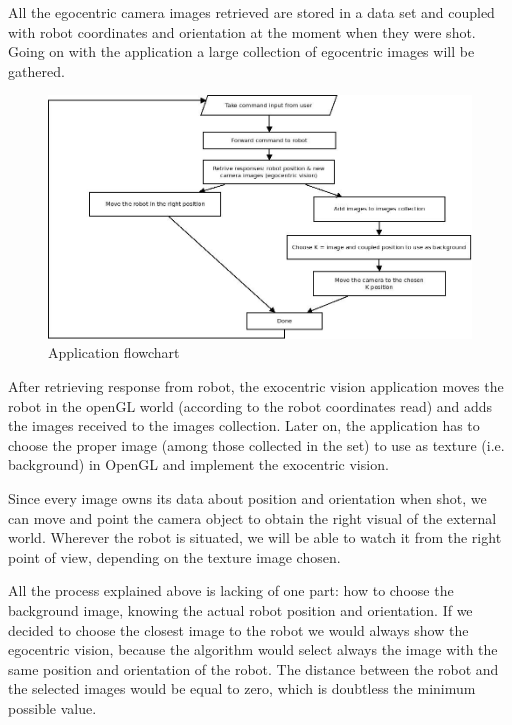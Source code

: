 %
All the egocentric camera images retrieved are stored in a data set and coupled
with robot coordinates and orientation at the moment when they were shot. Going
on with the application a large collection of egocentric images will be gathered.
%
\begin{figure}[!h]
  \begin{center}
    \includegraphics[width=400pt]{img/overall_diagram.jpeg}  %
    \caption{Application flowchart}
    \label{fig:overall_diagram}
  \end{center}
\end{figure}
%
After retrieving response from robot, the exocentric vision application moves the
robot in the openGL world (according to the robot coordinates read) and adds the
images received to the images collection. Later on, the application has to choose
the proper image (among those collected in the set) to use as texture (i.e. background)
in OpenGL and implement the exocentric vision.
%

%
Since every image owns its data about position and orientation when shot, we can
move and point the camera object to obtain the right visual of the external world.
Wherever the robot is situated, we will be able to watch it from the right point of view,
depending on the texture image chosen.
%

%
All the process explained above is lacking of one part: how to choose the background image,
knowing the actual robot position and orientation. If we decided to choose the closest image
to the robot we would always show the egocentric vision, because the algorithm would select
always the image with the same position and orientation of the robot. The distance between
the robot and the selected images would be equal to zero, which is doubtless the minimum possible
value.
%

